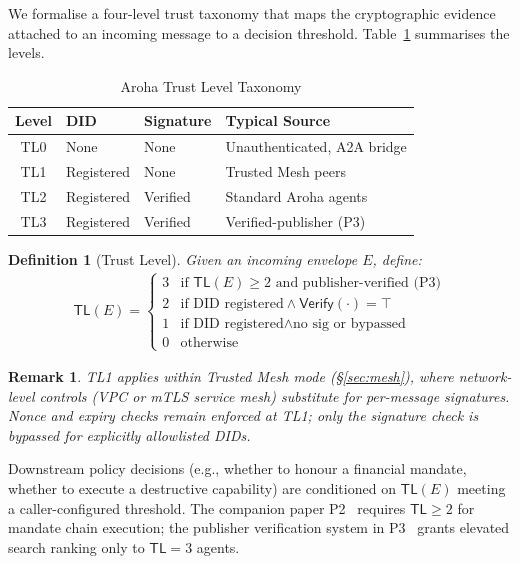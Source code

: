 \documentclass[conference]{IEEEtran}
\newtheorem{definition}{Definition}
\newtheorem{remark}{Remark}
\newcommand{\Verify}{\mathsf{Verify}}
\newcommand{\TL}{\mathsf{TL}}
\begin{document}
We formalise a four-level trust taxonomy that maps the
cryptographic evidence attached to an incoming message to a
decision threshold. Table~\ref{tab:trustlevels} summarises the
levels.

\begin{table}[t]
\centering
\caption{Aroha Trust Level Taxonomy}
\label{tab:trustlevels}
\begin{tabular}{@{}clll@{}}
\toprule
\textbf{Level} & \textbf{DID} & \textbf{Signature} &
  \textbf{Typical Source} \\
\midrule
TL0 & None & None & Unauthenticated, A2A bridge \\
TL1 & Registered & None & Trusted Mesh peers \\
TL2 & Registered & Verified & Standard Aroha agents \\
TL3 & Registered & Verified & Verified-publisher (P3) \\
\bottomrule
\end{tabular}
\end{table}

\begin{definition}[Trust Level]
Given an incoming envelope $E$, define:
\begin{align*}
\TL(E) = \begin{cases}
  3 & \text{if } \TL(E) \geq 2
      \text{ and publisher-verified (P3)} \\
  2 & \text{if DID registered} \land \Verify(\cdot) = \top \\
  1 & \text{if DID registered} \land \text{no sig or bypassed} \\
  0 & \text{otherwise}
\end{cases}
\end{align*}
\end{definition}

\begin{remark}
TL1 applies within Trusted Mesh mode (\S\ref{sec:mesh}), where
network-level controls (VPC or mTLS service mesh) substitute for
per-message signatures. Nonce and expiry checks remain enforced
at TL1; only the signature check is bypassed for explicitly
allowlisted DIDs.
\end{remark}

Downstream policy decisions (e.g., whether to honour a financial
mandate, whether to execute a destructive capability) are
conditioned on $\TL(E)$ meeting a caller-configured threshold.
The companion paper P2~\cite{aroha2025p2} requires $\TL \geq 2$
for mandate chain execution; the publisher verification system
in P3~\cite{aroha2025p3} grants elevated search ranking only to
$\TL = 3$ agents.
\end{document}
